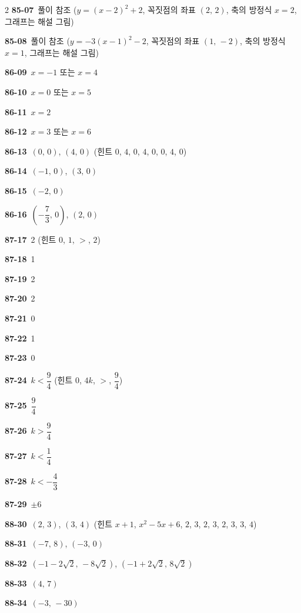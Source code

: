 \documentclass[10pt,a4paper]{article}
\begin{document}
\begin{multicols}{2}
\noindent\textbf{85-07}\ 풀이 참조 ($y=(x-2)^2+2$, 꼭짓점의 좌표 $(2,\,2)$, 축의 방정식 $x=2$, 그래프는 해설 그림)\par
\noindent\textbf{85-08}\ 풀이 참조 ($y=-3(x-1)^2-2$, 꼭짓점의 좌표 $(1,\,-2)$, 축의 방정식 $x=1$, 그래프는 해설 그림)\par
\noindent\textbf{86-09}\ $x=-1$ 또는 $x=4$\par
\noindent\textbf{86-10}\ $x=0$ 또는 $x=5$\par
\noindent\textbf{86-11}\ $x=2$\par
\noindent\textbf{86-12}\ $x=3$ 또는 $x=6$\par
\noindent\textbf{86-13}\ $(0,\,0)$, $(4,\,0)$ (힌트 $0$, $4$, $0$, $4$, $0$, $0$, $4$, $0$)\par
\noindent\textbf{86-14}\ $(-1,\,0)$, $(3,\,0)$\par
\noindent\textbf{86-15}\ $(-2,\,0)$\par
\noindent\textbf{86-16}\ $\left(-\dfrac{7}{3},\,0\right)$, $(2,\,0)$\par
\noindent\textbf{87-17}\ 2 (힌트 $0$, $1$, $>$, $2$)\par
\noindent\textbf{87-18}\ 1\par
\noindent\textbf{87-19}\ 2\par
\noindent\textbf{87-20}\ 2\par
\noindent\textbf{87-21}\ 0\par
\noindent\textbf{87-22}\ 1\par
\noindent\textbf{87-23}\ 0\par
\noindent\textbf{87-24}\ $k<\dfrac{9}{4}$ (힌트 $0$, $4k$, $>$, $\dfrac{9}{4}$)\par
\noindent\textbf{87-25}\ $\dfrac{9}{4}$\par
\noindent\textbf{87-26}\ $k>\dfrac{9}{4}$\par
\noindent\textbf{87-27}\ $k<\dfrac{1}{4}$\par
\noindent\textbf{87-28}\ $k<-\dfrac{4}{3}$\par
\noindent\textbf{87-29}\ $\pm 6$\par
\noindent\textbf{88-30}\ $(2,\,3)$, $(3,\,4)$ (힌트 $x+1$, $x^2-5x+6$, $2$, $3$, $2$, $3$, $2$, $3$, $3$, $4$)\par
\noindent\textbf{88-31}\ $(-7,\,8)$, $(-3,\,0)$\par
\noindent\textbf{88-32}\ $(-1-2\sqrt{2},\,-8\sqrt{2})$, $(-1+2\sqrt{2},\,8\sqrt{2})$\par
\noindent\textbf{88-33}\ $(4,\,7)$\par
\noindent\textbf{88-34}\ $(-3,\,-30)$\par

\end{multicols}
\end{document}
